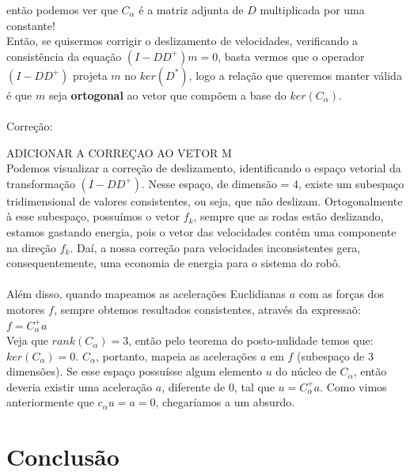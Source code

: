 \documentclass{article}
\begin{document}
então podemos ver que $C_{\alpha}$ é a matriz adjunta de $D$ multiplicada por uma constante!
\\ Então, se quisermos corrigir o deslizamento de velocidades, verificando a consistência da equação $(I-DD^+)m = 0$, basta vermos que o operador $(I - DD^+)$ projeta $m$ no $ker(D^*)$,
logo a relação que queremos manter válida é que $m$ seja \textbf{ortogonal} ao vetor que compõem a base do $ker(C_{\alpha})$.
\\ \\ Correção:

ADICIONAR A CORREÇAO AO VETOR M \\

Podemos visualizar a correção de deslizamento, identificando o espaço vetorial da transformação $(I - DD^+)$.
Nesse espaço, de dimensão = 4, existe um subespaço tridimensional de valores consistentes, ou seja, que não deslizam. Ortogonalmente à esse subespaço,
possuímos o vetor $f_{k}$, sempre que as rodas estão deslizando, estamos gastando energia, pois o vetor das velocidades contém uma componente na direção $f_{k}$.
Daí, a nossa correção para velocidades inconsistentes gera, consequentemente, uma economia de energia para o sistema do robô.
\\ \\ Além disso, quando mapeamos as acelerações Euclidianas $a$ com as forças dos motores $f$, sempre obtemos resultados consistentes, através da expressaõ:
\\ $f = C_{\alpha}^+a$
\\ Veja que $rank(C_{\alpha}) = 3$, então pelo teorema do posto-nulidade temos que: $ker(C_{\alpha}) = 0$. $C_{\alpha}$, portanto, mapeia as acelerações $a$  em $f$ (subespaço de 3 dimensões).
Se esse espaço possuísse algum elemento $u$ do núcleo de $C_{\alpha}$, então deveria existir uma aceleração $a$, diferente de 0, tal que $u = C_{\alpha}^+a$. Como vimos anteriormente que $c_ {\alpha}u = a = 0$, chegaríamos a um absurdo.

\section{Conclusão}
\end{document}
